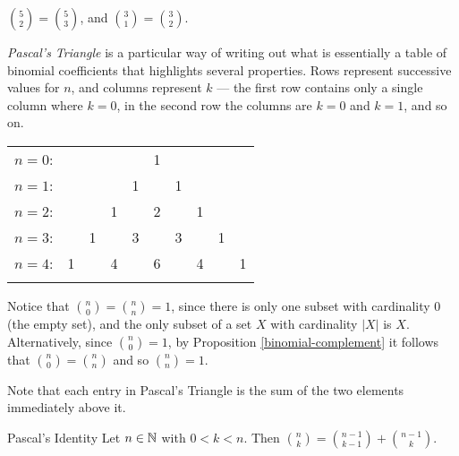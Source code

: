 \begin{exmp}
    $\binom{5}{2} = \binom{5}{3}$, and $\binom{3}{1} = \binom{3}{2}$.
\end{exmp}

\begin{defn}\label{pascals-triangle}
    \emph{Pascal's Triangle} is a particular way of writing out what is essentially a table of binomial coefficients that highlights several properties. Rows represent successive values for $n$, and columns represent $k$ --- the first row contains only a single column where $k=0$, in the second row the columns are $k=0$ and $k=1$, and so on.
    \begin{center}
        \begin{tabular}{rccccccccc}
            $n=0$:&    &    &    &    &  1\\\noalign{\smallskip\smallskip}
            $n=1$:&    &    &    &  1 &    &  1\\\noalign{\smallskip\smallskip}
            $n=2$:&    &    &  1 &    &  2 &    &  1\\\noalign{\smallskip\smallskip}
            $n=3$:&    &  1 &    &  3 &    &  3 &    &  1\\\noalign{\smallskip\smallskip}
            $n=4$:&  1 &    &  4 &    &  6 &    &  4 &    &  1\\\noalign{\smallskip\smallskip}
        \end{tabular}
    \end{center}
\end{defn}

\begin{rmk}
    Notice that $\binom{n}{0} = \binom{n}{n} = 1$, since there is only one subset with cardinality $0$ (the empty set), and the only subset of a set $X$ with cardinality $|X|$ is $X$. Alternatively, since $\binom{n}{0} = 1$, by Proposition \ref{binomial-complement} it follows that $\binom{n}{0} = \binom{n}{n}$ and so $\binom{n}{n} = 1$.
\end{rmk}

\begin{rmk}
    Note that each entry in Pascal's Triangle is the sum of the two elements immediately above it.
\end{rmk}

\begin{prop}{Pascal's Identity}\label{pascals-identity}\proofbreak
    Let $n \in \mathbb{N}$ with $0 < k < n$. Then $\binom{n}{k} = \binom{n-1}{k-1} + \binom{n-1}{k}$.
\end{prop}

